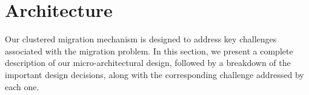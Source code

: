 \section{Architecture}
\label{sec:Architecture}

Our clustered migration mechanism is designed to address key challenges associated with the migration problem. In this section, we present a complete description of our micro-architectural design, followed by a breakdown of the important design decisions, along with the corresponding challenge addressed by each one.

